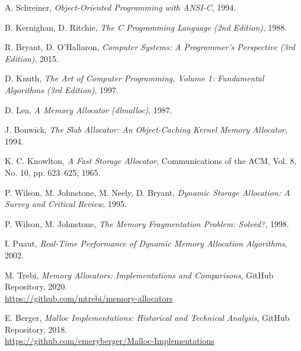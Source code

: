 \begin{thebibliography}{9}

  A. Schreiner, \emph{Object-Oriented Programming with ANSI-C}, 1994.

  B. Kernighan, D. Ritchie, \emph{The C Programming Language (2nd Edition)}, 1988.

  R. Bryant, D. O’Hallaron, \emph{Computer Systems: A Programmer’s Perspective (3rd Edition)}, 2015.

  D. Knuth, \emph{The Art of Computer Programming, Volume 1: Fundamental Algorithms (3rd Edition)}, 1997.

  D. Lea, \emph{A Memory Allocator (dlmalloc)}, 1987.

  J. Bonwick, \emph{The Slab Allocator: An Object-Caching Kernel Memory Allocator}, 1994.

    K. C. Knowlton, \emph{A Fast Storage Allocator}, Communications of the ACM, Vol. 8, No. 10, pp. 623–625, 1965.

  P. Wilson, M. Johnstone, M. Neely, D. Bryant, \emph{Dynamic Storage Allocation: A Survey and Critical Review}, 1995.

  P. Wilson, M. Johnstone, \emph{The Memory Fragmentation Problem: Solved?}, 1998.

  I. Puaut, \emph{Real-Time Performance of Dynamic Memory Allocation Algorithms}, 2002.

  M. Trebi, \emph{Memory Allocators: Implementations and Comparisons}, GitHub Repository, 2020. \\
  \url{https://github.com/mtrebi/memory-allocators}

  E. Berger, \emph{Malloc Implementations: Historical and Technical Analysis}, GitHub Repository, 2018. \\
  \url{https://github.com/emeryberger/Malloc-Implementations}

\end{thebibliography}